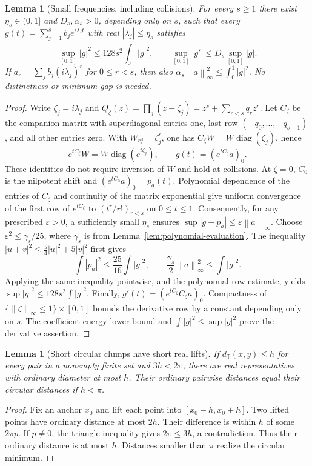 \documentclass[11pt]{article}
\newtheorem{lemma}[theorem]{Lemma}
\theoremstyle{remark}\newtheorem{remark}[theorem]{Remark}
\newcommand{\T}{\mathbb T}
\newcommand{\norm}[1]{\left\lVert#1\right\rVert}
\newcommand{\abs}[1]{\left|#1\right|}
\DeclareMathOperator{\diag}{diag}
\begin{document}
\begin{lemma}[Small frequencies, including collisions]
\label{lem:small-frequency-evaluation}
For every $s\ge1$ there exist $\eta_s\in(0,1]$ and $D_s,\alpha_s>0$,
depending only on $s$, such that every
$g(t)=\sum_{j=1}^s b_je^{i\lambda_jt}$ with real
$\abs{\lambda_j}\le\eta_s$ satisfies
\begin{equation}
\label{eq:continuous-pointwise}
 \sup_{[0,1]}\abs g^2\le128s^2\int_0^1\abs g^2,
 \qquad
 \sup_{[0,1]}\abs{g'}\le D_s\sup_{[0,1]}\abs g.
\end{equation}
If $a_r=\sum_jb_j(i\lambda_j)^r$ for $0\le r<s$, then also
$\alpha_s\norm a_\infty^2\le\int_0^1\abs g^2$.
No distinctness or minimum gap is needed.
\end{lemma}
\begin{proof}
Write $\zeta_j=i\lambda_j$ and
$Q_\zeta(z)=\prod_j(z-\zeta_j)=z^s+\sum_{r<s}q_rz^r$.
Let $C_\zeta$ be the companion matrix with superdiagonal entries one,
last row $(-q_0,\ldots,-q_{s-1})$, and all other entries zero.
With $W_{rj}=\zeta_j^r$, one has
$C_\zeta W=W\diag(\zeta_j)$, hence
\[
 e^{tC_\zeta}W=W\diag(e^{t\zeta_j}),\qquad
 g(t)=(e^{tC_\zeta}a)_0.
\]
These identities do not require inversion of $W$ and hold at collisions.
At $\zeta=0$, $C_0$ is the nilpotent shift and
$(e^{tC_0}a)_0=p_a(t)$. Polynomial dependence of the entries of $C_\zeta$
and continuity of the matrix exponential give uniform convergence of the
first row of $e^{tC_\zeta}$ to $(t^r/r!)_{r<s}$ on $0\le t\le1$.
Consequently, for any prescribed $\varepsilon>0$, a sufficiently small
$\eta_s$ ensures
$\sup\abs{g-p_a}\le\varepsilon\norm a_\infty$.
Choose $\varepsilon^2\le\gamma_s/25$, where $\gamma_s$ is from
Lemma~\ref{lem:polynomial-evaluation}. The inequality
$\abs{u+v}^2\le\tfrac54\abs u^2+5\abs v^2$ first gives
\[
 \int\abs{p_a}^2\le\frac{25}{16}\int\abs g^2,
 \qquad \frac{\gamma_s}{2}\norm a_\infty^2\le\int\abs g^2.
\]
Applying the same inequality pointwise, and the polynomial row estimate,
yields $\sup\abs g^2\le128s^2\int\abs g^2$.
Finally, $g'(t)=(e^{tC_\zeta}C_\zeta a)_0$. Compactness of
$\{\norm\zeta_\infty\le1\}\times[0,1]$ bounds the derivative row by a
constant depending only on $s$. The coefficient-energy lower bound and
$\int\abs g^2\le\sup\abs g^2$ prove the derivative assertion.
\end{proof}

\begin{lemma}[Short circular clumps have short real lifts]
\label{lem:short-clump-lift}
If $d_\T(x,y)\le h$ for every pair in a nonempty finite set and
$3h<2\pi$, there are real representatives with ordinary diameter at most
$h$. Their ordinary pairwise distances equal their circular distances if
$h<\pi$.
\end{lemma}
\begin{proof}
Fix an anchor $x_0$ and lift each point into $[x_0-h,x_0+h]$.
Two lifted points have ordinary distance at most $2h$. Their difference
is within $h$ of some $2\pi p$. If $p\ne0$, the triangle inequality gives
$2\pi\le3h$, a contradiction. Thus their ordinary distance is at most
$h$. Distances smaller than $\pi$ realize the circular minimum.
\end{proof}
\end{document}
